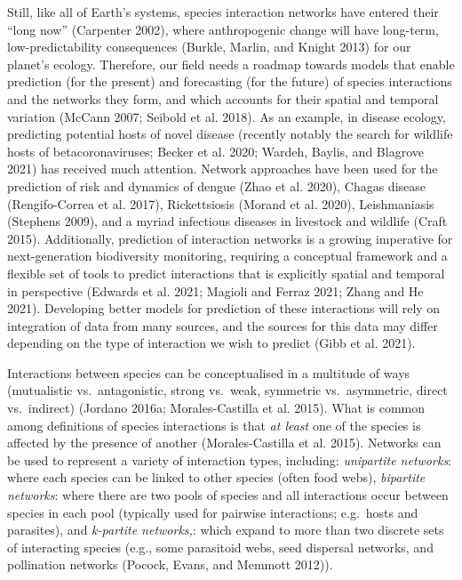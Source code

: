 \documentclass[11pt]{article}
\begin{document}
Still, like all of Earth's systems, species interaction networks have
entered their ``long now'' (Carpenter 2002), where anthropogenic change
will have long-term, low-predictability consequences (Burkle, Marlin,
and Knight 2013) for our planet's ecology. Therefore, our field needs a
roadmap towards models that enable prediction (for the present) and
forecasting (for the future) of species interactions and the networks
they form, and which accounts for their spatial and temporal variation
(McCann 2007; Seibold et al. 2018). As an example, in disease ecology,
predicting potential hosts of novel disease (recently notably the search
for wildlife hosts of betacoronaviruses; Becker et al. 2020; Wardeh,
Baylis, and Blagrove 2021) has received much attention. Network
approaches have been used for the prediction of risk and dynamics of
dengue (Zhao et al. 2020), Chagas disease (Rengifo-Correa et al. 2017),
Rickettsiosis (Morand et al. 2020), Leishmaniasis (Stephens 2009), and a
myriad infectious diseases in livestock and wildlife (Craft 2015).
Additionally, prediction of interaction networks is a growing imperative
for next-generation biodiversity monitoring, requiring a conceptual
framework and a flexible set of tools to predict interactions that is
explicitly spatial and temporal in perspective (Edwards et al. 2021;
Magioli and Ferraz 2021; Zhang and He 2021). Developing better models
for prediction of these interactions will rely on integration of data
from many sources, and the sources for this data may differ depending on
the type of interaction we wish to predict (Gibb et al. 2021).

Interactions between species can be conceptualised in a multitude of
ways (mutualistic vs.~antagonistic, strong vs.~weak, symmetric
vs.~asymmetric, direct vs.~indirect) (Jordano 2016a; Morales-Castilla et
al. 2015). What is common among definitions of species interactions is
that \emph{at least} one of the species is affected by the presence of
another (Morales-Castilla et al. 2015). Networks can be used to
represent a variety of interaction types, including: \emph{unipartite
networks}: where each species can be linked to other species (often food
webs), \emph{bipartite networks}: where there are two pools of species
and all interactions occur between species in each pool (typically used
for pairwise interactions; e.g.~hosts and parasites), and
\emph{k-partite networks,}: which expand to more than two discrete sets
of interacting species (e.g., some parasitoid webs, seed dispersal
networks, and pollination networks (Pocock, Evans, and Memmott 2012)).
\end{document}
